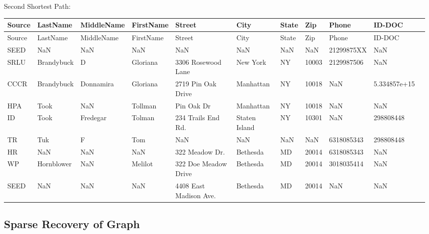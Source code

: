 \documentclass{article} %
\begin{document}
Second Shortest Path:
\begin{table}[h]
\centering
\tiny
\begin{tabular}{|l|l|l|l|l|l|l|l|l|l|l|}
\hline
\textbf{Source}  & \textbf{LastName} & \textbf{MiddleName} & \textbf{FirstName} & \textbf{Street} & \textbf{City} & \textbf{State} & \textbf{Zip} & \textbf{Phone} & \textbf{ID-DOC} \\ \hline

Source & LastName& MiddleName& FirstName& Street& City& State&  Zip&   Phone&  ID-DOC  \\ \hline
SEED&        NaN&        NaN&    NaN&   NaN&  NaN&   NaN&  NaN&   21299875XX&     NaN \\ \hline
   SRLU&  Brandybuck&   D&  Gloriana&  3306 Rosewood Lane&  New York&  NY&  10003&   2129987506&     NaN  \\ \hline
   CCCR&   Brandybuck&  Donnamira&   Gloriana&  2719 Pin Oak Drive&  Manhattan&    NY&  10018&   NaN&  5.334857e+15      \\ \hline
  HPA&    Took&        NaN&   Tollman&  Pin Oak Dr& Manhattan&    NY&  10018&   NaN&     NaN     \\ \hline
    ID&    Took&   Fredegar&   Tolman&  234 Trails End Rd.&  Staten Island&    NY&  10301&   NaN&   298808448 \\ \hline
   TR&       Tuk&          F&     Tom&    NaN&  NaN&   NaN&  NaN&  6318085343&  298808448  \\ \hline
   HR&        NaN&        NaN&    NaN&  322 Meadow Dr.&  Bethesda&    MD&  20014&  6318085343&     NaN  \\ \hline
   WP&  Hornblower&        NaN&    Melilot&  322 Doe Meadow Drive&  Bethesda&    MD&  20014&  3018035414&    NaN  \\ \hline
   SEED&     NaN&        NaN&       NaN&  4408 East Madison Ave.&    Bethesda&    MD&  20014&   NaN&     NaN  \\ \hline
\end{tabular}
\end{table}

\subsection{Sparse Recovery of Graph}
\end{document}

